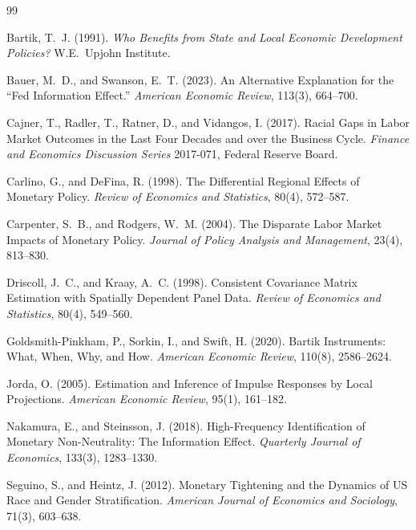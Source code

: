 \documentclass[11pt]{article}
\begin{document}
\begin{thebibliography}{99}
\setlength{\itemsep}{2pt}

Bartik, T.~J. (1991). \textit{Who Benefits from State and Local Economic Development Policies?}
W.E.\ Upjohn Institute.

Bauer, M.~D., and Swanson, E.~T. (2023). An Alternative Explanation for the ``Fed Information
Effect.'' \textit{American Economic Review}, 113(3), 664--700.

Cajner, T., Radler, T., Ratner, D., and Vidangos, I. (2017). Racial Gaps in Labor Market
Outcomes in the Last Four Decades and over the Business Cycle. \textit{Finance and Economics
Discussion Series} 2017-071, Federal Reserve Board.

Carlino, G., and DeFina, R. (1998). The Differential Regional Effects of Monetary Policy.
\textit{Review of Economics and Statistics}, 80(4), 572--587.

Carpenter, S.~B., and Rodgers, W.~M. (2004). The Disparate Labor Market Impacts of Monetary
Policy. \textit{Journal of Policy Analysis and Management}, 23(4), 813--830.

Driscoll, J.~C., and Kraay, A.~C. (1998). Consistent Covariance Matrix Estimation with
Spatially Dependent Panel Data. \textit{Review of Economics and Statistics}, 80(4), 549--560.

Goldsmith-Pinkham, P., Sorkin, I., and Swift, H. (2020). Bartik Instruments: What, When, Why,
and How. \textit{American Economic Review}, 110(8), 2586--2624.

Jorda, O. (2005). Estimation and Inference of Impulse Responses by Local Projections.
\textit{American Economic Review}, 95(1), 161--182.

Nakamura, E., and Steinsson, J. (2018). High-Frequency Identification of Monetary
Non-Neutrality: The Information Effect. \textit{Quarterly Journal of Economics}, 133(3),
1283--1330.

Seguino, S., and Heintz, J. (2012). Monetary Tightening and the Dynamics of US Race and Gender
Stratification. \textit{American Journal of Economics and Sociology}, 71(3), 603--638.

\end{thebibliography}
\end{document}
